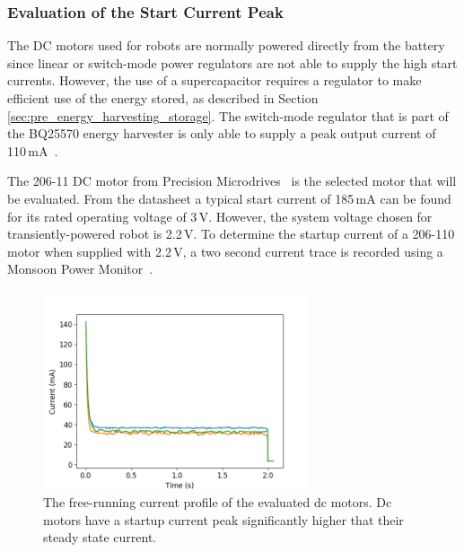 \subsubsection{Evaluation of the Start Current Peak}
The DC motors used for robots are normally powered directly from the battery since linear or switch-mode power regulators are not able to supply the high start currents.
However, the use of a supercapacitor requires a regulator to make efficient use of the energy stored, as described in Section \ref{sec:pre_energy_harvesting_storage}.
The switch-mode regulator that is part of the BQ25570 energy harvester is only able to supply a peak output current of 110\,mA~\cite{bq25570_2017}.

The 206-11 DC motor from Precision Microdrives~\cite{gearmotor_206-110_2017} is the selected motor that will be evaluated.
From the datasheet a typical start current of 185\,mA can be found for its rated operating voltage of 3\,V.
However, the system voltage chosen for transiently-powered robot is 2.2\,V.
To determine the startup current of a 206-110 motor when supplied with 2.2\,V, a two second current trace is recorded using a Monsoon Power Monitor~\cite{monsoon_powermonitor_2017}.


\begin{figure}%
	\centering
	\includegraphics[width=0.7\textwidth]{pics/free_running_current.png}
	\caption{The free-running current profile of the evaluated dc motors. Dc motors have a startup current peak significantly higher that their steady state current.}
	\label{fig:free_running_current}
\end{figure}

